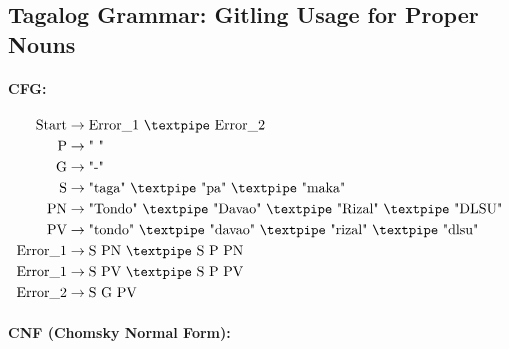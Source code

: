 \subsection{Tagalog Grammar: Gitling Usage for Proper Nouns}

\paragraph{CFG:}

\begin{equation*}
    \begin{aligned}
        \text{Start}  & \rightarrow \text{Error\_1 {\textpipe} Error\_2}   \\
        \text{P}   & \rightarrow \text{" "}\\
        \text{G} & \rightarrow \text{"-"}\\        
        \text{S}    & \rightarrow \text{"taga" {\textpipe} "pa" {\textpipe} "maka"}\\
        \text{PN} & \rightarrow \text{"Tondo" {\textpipe} "Davao" {\textpipe} "Rizal" {\textpipe} "DLSU"}   \\
        \text{PV} & \rightarrow \text{"tondo" {\textpipe} "davao" {\textpipe} "rizal" {\textpipe} "dlsu"}   \\
        \text{Error\_1}  & \rightarrow \text{S PN {\textpipe} S P PN}   \\
        \text{Error\_1}  & \rightarrow \text{S PV {\textpipe} S P PV}   \\
        \text{Error\_2}  & \rightarrow \text{S G PV}   
    \end{aligned}
\end{equation*}

\paragraph{CNF (Chomsky Normal Form):}


